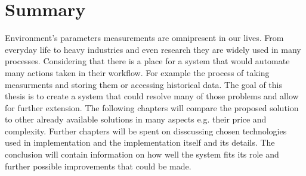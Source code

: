 \chapter*{Summary}
Environment's parameters measurements are omnipresent in our lives. 
From everyday life to heavy industries and even research they are widely used in many 
processes. Considering that there is a place for a system that would
automate many actions taken in their workflow. For example the
process of taking measurments and storing them or accessing historical
data. The goal of this thesis is to create a system that could
resolve many of those problems and allow for further extension.
The following chapters will compare the proposed solution to other
already available solutions in many aspects e.g. their price and
complexity. Further chapters will be spent on disscussing chosen
technologies used in implementation and the implementation itself and
its details. The conclusion will contain information on how well
the system fits its role and further possible improvements that could be made.
